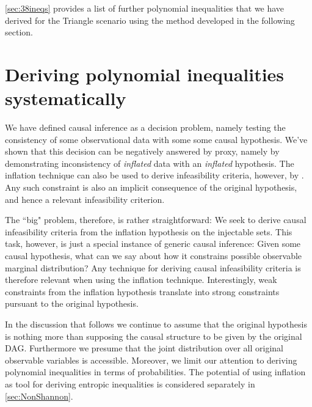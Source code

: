 \cref{sec:38ineqs} provides a list of further polynomial inequalities that we have derived for the Triangle scenario using the method developed in the following section.

\section{Deriving polynomial inequalities systematically}
\label{sec:ineqs}

We have defined causal inference as a decision problem, namely testing the consistency of some observational data with some some causal hypothesis. We've shown that this decision can be negatively answered by proxy, namely by demonstrating inconsistency of \emph{inflated} data with an \emph{inflated} hypothesis. The inflation technique can also be used to derive infeasibility criteria, however, by . Any such constraint is also an implicit consequence of the original hypothesis, and hence a relevant infeasibility criterion.

The ``big" problem, therefore, is rather straightforward: We seek to derive causal infeasibility criteria from the inflation hypothesis on the injectable sets. This task, however, is just a special instance of generic causal inference: Given some causal hypothesis, what can we say about how it constrains possible observable marginal distribution? Any technique for deriving causal infeasibility criteria is therefore relevant when using the inflation technique. Interestingly, weak constraints from the inflation hypothesis translate into strong constraints pursuant to the original hypothesis.

In the discussion that follows we continue to assume that the original hypothesis is nothing more than supposing the causal structure to be given by the original DAG. Furthermore we presume that the joint distribution over all original observable variables is accessible. Moreover, we limit our attention to deriving polynomial inequalities in terms of probabilities. The potential of using inflation as tool for deriving entropic inequalities is considered separately in \cref{sec:NonShannon}.

